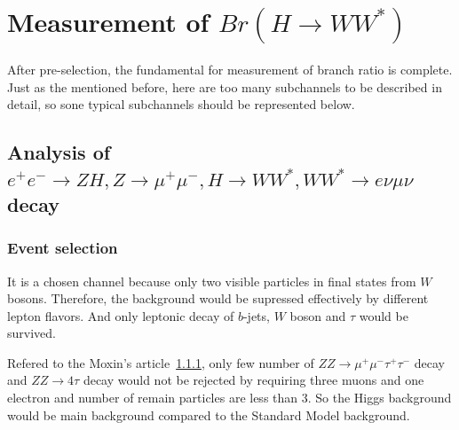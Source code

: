 \documentclass[11pt,a4paper]{cepcnote}
\begin{document}
\section{Measurement of $Br(H\rightarrow WW^*)$}
After pre-selection, the fundamental for measurement of branch ratio is complete. Just as the mentioned before, here are too many subchannels
to be described in detail, so sone typical subchannels should be represented below. 

\subsection{Analysis of $e^+e^-\rightarrow ZH, Z\rightarrow\mu^+\mu^-, H\rightarrow WW^*, WW^*\rightarrow e\nu\mu\nu$ decay}
\subsubsection{Event selection}
It is a chosen channel because only two visible particles in final states from $W$ bosons.
Therefore, the background would be supressed effectively by different lepton flavors.
And only leptonic decay of $b$-jets, $W$ boson and $\tau$ would be survived.

Refered to the Moxin's article~\ref{}, only few number of $ZZ\rightarrow \mu^+\mu^-\tau^+\tau^-$ decay and $ZZ\rightarrow 4\tau$ decay 
would not be rejected by requiring three muons and one electron and number of remain particles are less than 3. 
So the Higgs background would be main background compared to the Standard Model background.
\end{document}
